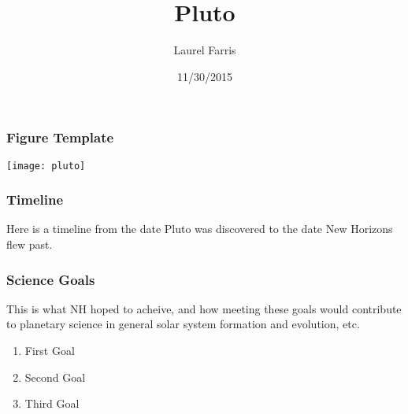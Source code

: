 \documentclass{beamer}
\title{Pluto}
\author{Laurel Farris}
\date{11/30/2015}
\begin{document}
\maketitle



\begin{frame}
    \frametitle{Figure Template}
    \texttt{[image: pluto]}





\end{frame}



\begin{frame}
    \frametitle{Timeline}
    Here is a timeline from the date Pluto was discovered to the date
    New Horizons flew past.
\end{frame}

\begin{frame}
    \frametitle{Science Goals}
    This is what NH hoped to acheive, and how meeting these goals
    would contribute to planetary science in general solar system
    formation and evolution, etc.
    \begin{enumerate}
    \item First Goal
    \item Second Goal
    \item Third Goal
    \end{enumerate}
\end{frame}
\end{document}

